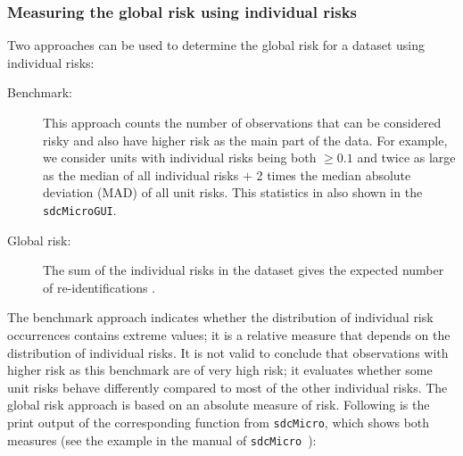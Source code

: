 \documentclass[12pt]{scrartcl}\usepackage[]{graphicx}\usepackage[]{color}
\makeatletter
\newenvironment{kframe}{%
 \def\at@end@of@kframe{}%
 \ifinner\ifhmode%
  \def\at@end@of@kframe{\end{minipage}}%
  \begin{minipage}{\columnwidth}%
 \fi\fi%
 \def\FrameCommand##1{\hskip\@totalleftmargin \hskip-\fboxsep
 \colorbox{shadecolor}{##1}\hskip-\fboxsep
     \hskip-\linewidth \hskip-\@totalleftmargin \hskip\columnwidth}%
 \MakeFramed {\advance\hsize-\width
   \@totalleftmargin\z@ \linewidth\hsize
   \@setminipage}}%
 {\par\unskip\endMakeFramed%
 \at@end@of@kframe}
\newenvironment{knitrout}{}{} %
\newcommand{\sdcMicro}{\texttt{sdcMicro}}
\newcommand{\sdcMicroGUI}{\texttt{sdcMicroGUI}}
\makeatother
\begin{document}
\subsubsection{Measuring the global risk using individual risks}
Two approaches can be used to determine the global risk for a dataset using individual risks:

\begin{description}
\item[Benchmark:] This approach counts the number of observations that can be considered risky and also have higher risk as the main part of the data. For example, we consider units with individual risks being  both $\geq 0.1$ and twice as large as the median of all individual risks $+$ 2 times the median absolute deviation (MAD) of all unit risks. This statistics in also shown in the \sdcMicroGUI .
\item[Global risk:] The sum of the individual risks in the dataset gives the expected number of re-identifications \citep[see][]{muargus}.
\end{description}

The benchmark approach indicates whether the distribution of individual risk occurrences contains extreme values; it is a relative measure that depends on the distribution of individual risks. It is not valid to conclude that observations with higher risk as this benchmark are of very high risk; it evaluates whether some unit risks behave differently compared to most of the other individual risks. The global risk approach is based on an absolute measure of risk. Following is the print output of the corresponding function from \sdcMicro , which shows both measures (see the example in the manual of \sdcMicro \ \citep{sdcMicro}):

\begin{knitrout}
\color{fgcolor}\begin{kframe}


{\ttfamily\noindent\itshape\color{messagecolor}{\#\# Risk measures:\\\#\# \\\#\# Number of observations with higher risk than the main part of the data: 0\\\#\# Expected number of re-identifications: 10.78 (0.24 \%)\\\#\# \\\#\# Information on hierarchical risk:\\\#\# Expected number of re-identifications: 51.81 (1.13 \%)\\\#\# ----------------------------------------------------------------------}}\end{kframe}
\end{knitrout}
\end{document}
